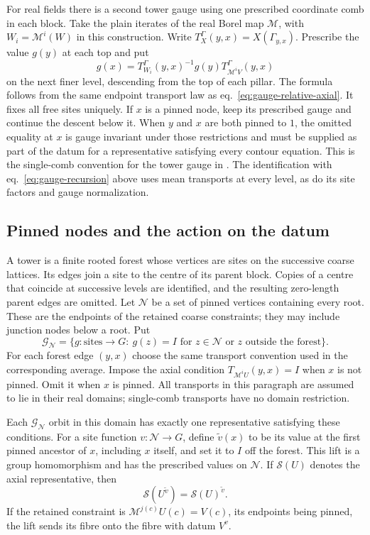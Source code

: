 \documentclass[11pt,letterpaper,reqno]{amsart}
\makeatletter
\numberwithin{equation}{section}
\renewcommand{\eqref}[1]{\textup{eq.~\ref{#1}}}
\theoremstyle{definition}
\newcommand{\ms@minorstart}{%
  \pushQED{\qed}\renewcommand{\qedsymbol}{$\blacksquare$}}
\newenvironment{proposition}[1][]{\ms@minorstart\ms@proposition[#1]}
  {\popQED\endms@proposition}
\theoremstyle{remark}
\makeatother
\begin{document}
For real fields there is a second tower gauge using one prescribed
coordinate comb in each block. Take the plain iterates of the real
Borel map \(\mathcal M\), with \(W_i=\mathcal M^i(W)\) in this
construction. Write \(T^\Gamma_X(y,x)=X(\Gamma_{y,x})\).
Prescribe the value \(g(y)\) at each top and put
\[
 g(x)=T^\Gamma_{W_i}(y,x)^{-1}g(y)
                   T^\Gamma_{\mathcal M^i V}(y,x)
\]
on the next finer level, descending from the top of each pillar.
The formula follows from the same endpoint transport law as
\eqref{eq:gauge-relative-axial}. It fixes all free sites uniquely.
If \(x\) is a pinned node, keep its prescribed gauge and continue
the descent below it. When \(y\) and \(x\) are both pinned to \(1\),
the omitted equality at \(x\) is gauge invariant under those
restrictions and must be supplied as part of the datum for a
representative satisfying every contour equation. This is the
single-comb convention for the tower gauge in \cite[\S B]{Bal85g}.
The identification with \eqref{eq:gauge-recursion} above uses mean
transports at every level, as do its site factors and gauge
normalization.

\subsection{Pinned nodes and the action on the datum}

A tower is a finite rooted forest whose vertices are sites on the
successive coarse lattices. Its edges join a site to the centre of its
parent block. Copies of a centre that coincide at successive levels
are identified, and the resulting zero-length parent edges are omitted.
Let $\mathcal N$ be a set of pinned vertices containing
every root. These are the endpoints of the retained coarse constraints;
they may include junction nodes below a root. Put
\[
 \mathcal G_{\mathcal N}=\{g:\text{sites}\to G:\ g(z)=I\text{ for }z\in\mathcal N\text{ or }z\text{ outside the forest}\}.
\]
For each forest edge $(y,x)$ choose the same transport convention used
in the corresponding average. Impose the axial condition
$T_{\mathcal M^iU}(y,x)=I$ when $x$ is not pinned. Omit it when $x$ is
pinned. All transports in this paragraph are assumed to lie in their
real domains; single-comb transports have no domain restriction.

\begin{proposition}[Pinned axial representative]\label{prop:pinned-representative}
Each $\mathcal G_{\mathcal N}$ orbit in this domain has exactly one
representative satisfying these conditions. For a site function
$v:\mathcal N\to G$, define $\widetilde v(x)$ to be its value at the first
pinned ancestor of $x$, including $x$ itself, and set it to $I$
off the forest. This lift is a group
homomorphism and has the prescribed values on $\mathcal N$.
If $\mathcal S(U)$ denotes the axial representative, then
\begin{equation}\label{eq:pinned-covariance}
 \mathcal S(U^{\widetilde v})=\mathcal S(U)^{\widetilde v}.
\end{equation}
If the retained constraint is $\mathcal M^{j(c)}U(c)=V(c)$, its
endpoints being pinned, the lift sends its fibre onto the fibre with
datum $V^v$.
\end{proposition}
\end{document}
